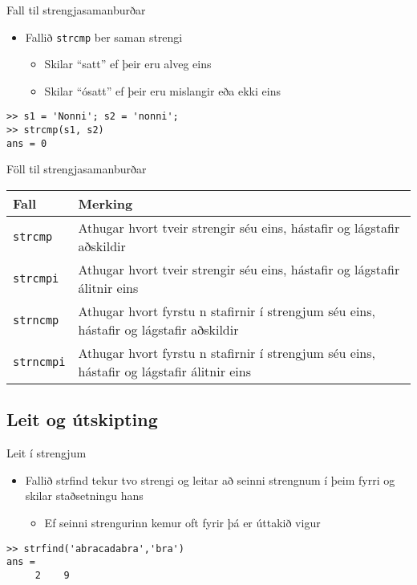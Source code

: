 \documentclass{beamer}
\begin{document}
\begin{frame}[fragile]{Fall til strengjasamanburðar}
\begin{itemize}
 \item Fallið \texttt{strcmp} ber saman strengi
 \begin{itemize}
  \item Skilar ``satt'' ef þeir eru alveg eins
  \item Skilar ``ósatt'' ef þeir eru mislangir eða ekki eins
 \end{itemize}
\end{itemize}
\begin{verbatim}
>> s1 = 'Nonni'; s2 = 'nonni';
>> strcmp(s1, s2)
ans = 0
\end{verbatim}
\end{frame}

\begin{frame}{Föll til strengjasamanburðar}
\vspace{\baselineskip}
\begin{center}
\begin{tabular}{lp{8cm}}
\toprule
Fall&Merking\\
\midrule
\texttt{strcmp}&Athugar hvort tveir strengir séu eins, hástafir og lágstafir aðskildir\\
\texttt{strcmpi}&Athugar hvort tveir strengir séu eins, hástafir og lágstafir álitnir eins\\
\texttt{strncmp}&Athugar hvort fyrstu n stafirnir í strengjum séu eins, hástafir og lágstafir aðskildir\\
\texttt{strncmpi}&Athugar hvort fyrstu n stafirnir í strengjum séu eins, hástafir og lágstafir álitnir eins\\
\bottomrule
\end{tabular}
\end{center}
\end{frame}

\subsection{Leit og útskipting}

\begin{frame}[fragile]{Leit í strengjum}
\begin{itemize}
 \item Fallið strfind tekur tvo strengi og leitar að seinni strengnum í þeim fyrri og skilar staðsetningu hans
 \begin{itemize}
  \item Ef seinni strengurinn kemur oft fyrir þá er úttakið vigur
 \end{itemize}
\end{itemize}
\begin{verbatim}
>> strfind('abracadabra','bra')
ans =
     2    9
\end{verbatim}
\end{frame}
\end{document}
